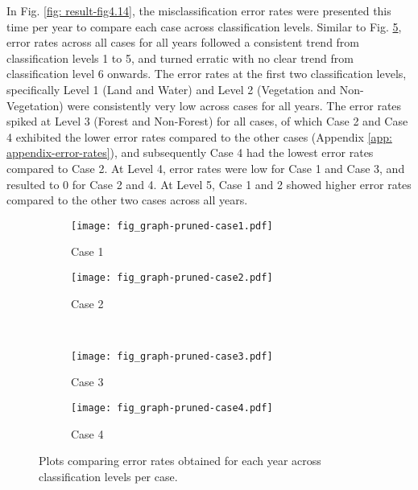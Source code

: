 In Fig. \ref{fig: result-fig4.14}, the misclassification error rates were presented this time per year to compare each case across classification levels. Similar to Fig. \ref{fig: result-fig4.13}, error rates across all cases for all years followed a consistent trend from classification levels 1 to 5, and turned erratic with no clear trend from classification level 6 onwards. The error rates at the first two classification levels, specifically Level 1 (Land and Water) and Level 2 (Vegetation and Non-Vegetation) were consistently very low across cases for all years. The error rates spiked at Level 3 (Forest and Non-Forest) for all cases, of which Case 2 and Case 4 exhibited the lower error rates compared to the other cases (Appendix \ref{app: appendix-error-rates}), and subsequently Case 4 had the lowest error rates compared to Case 2. At Level 4, error rates were low for Case 1 and Case 3, and resulted to 0 for Case 2 and 4. At Level 5, Case 1 and 2 showed higher error rates compared to the other two cases across all years.\\

\begin{figure}[!ht] \centering
	\captionsetup[subfigure]{width=2.0in} %
	\begin{subfigure}[t]{0.49\textwidth}
		\texttt{[image: fig\_graph-pruned-case1.pdf]}
		\caption[Error rates across levels per case.]{Case 1}
		\label{fig: result-fig4.13a}
	\end{subfigure}
	\begin{subfigure}[t]{0.49\textwidth}
		\texttt{[image: fig\_graph-pruned-case2.pdf]}
		\caption[Error rates across levels per case.]{Case 2}
		\label{fig: result-fig4.13b}
	\end{subfigure}\\
	\vspace{15pt}
	\begin{subfigure}[t]{0.49\textwidth}
		\texttt{[image: fig\_graph-pruned-case3.pdf]}
		\caption[Error rates across levels per case.]{Case 3}
		\label{fig: result-fig4.13c}
	\end{subfigure}
	\begin{subfigure}[t]{0.49\textwidth}
		\texttt{[image: fig\_graph-pruned-case4.pdf]}
		\caption[Error rates across levels per case.]{Case 4}
		\label{fig: result-fig4.13d}
	\end{subfigure}
	\vspace{5pt}
	\caption[Plots comparing error rates obtained for each year across classification levels per case.]{Plots comparing error rates obtained for each year across classification levels per case.}
	\label{fig: result-fig4.13}
\end{figure}

